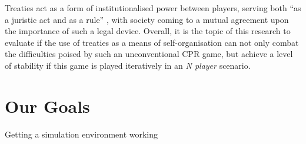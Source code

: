 Treaties act as a form of institutionalised power between players, serving both ``as a juristic act and as a rule'' \cite{reuter1995introduction}, with society coming to a mutual agreement upon the importance of such a legal device. Overall, it is the topic of this research to evaluate if the use of treaties as a means of self-organisation can not only combat the difficulties poised by such an unconventional CPR game, but achieve a level of stability if this game is played iteratively in an \textit{N player} scenario.

\section{Our Goals}
Getting a simulation environment working